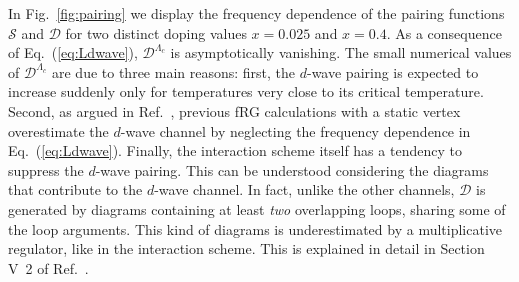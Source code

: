 \begin{widetext}
In Fig.~\ref{fig:pairing} we display the frequency dependence of the pairing functions $\mathcal{S}$ and $\mathcal{D}$ for two distinct doping values $x=0.025$ and $x=0.4$. 
As a consequence of Eq.~(\ref{eq:Ldwave}), $\mathcal{D}^{\Lambda_c}$ is asymptotically vanishing.\cite{Wentzell2016a}
The small numerical values of $\mathcal{D}^{\Lambda_c}$ are due to three main reasons: 
first, the $d$-wave pairing is expected to increase suddenly only for temperatures very close to its critical temperature. 
Second, as argued in Ref.~, previous fRG calculations with a static vertex overestimate the $d$-wave channel by neglecting the frequency dependence in Eq.~(\ref{eq:Ldwave}). 
Finally, the interaction scheme itself has a tendency to suppress the $d$-wave pairing. 
This can be understood considering the diagrams that contribute to the $d$-wave channel. In fact, unlike the other channels, $\mathcal{D}$ is generated by diagrams containing at least \emph{two} overlapping loops, sharing some of the loop arguments. This kind of diagrams is underestimated by a multiplicative regulator, like in the interaction scheme.  
This is explained in detail in Section V~2 of Ref.~.

\end{widetext}
